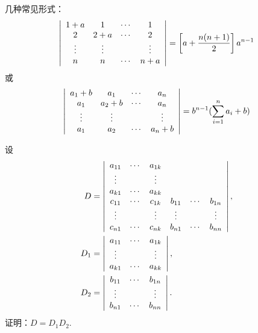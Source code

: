\begin{frame} 
\begin{zhu}
  几种常见形式：
  $$
  \left|
    \begin{array}{cccc}
      1+a &  1  & \cdots & 1   \\
      2   & 2+a & \cdots & 2  \\
      \vdots & \vdots &     & \vdots \\
      n   &  n  & \cdots & n+a
    \end{array}
  \right|  = \left[a+ \frac{n(n+1)}2\right]a^{n-1}
  $$
  或
  $$
  \left|
    \begin{array}{cccc}
      a_1+b & a_1   & \cdots & a_n   \\
      a_1   & a_2+b & \cdots  & a_n   \\
      \vdots   & \vdots  &     & \vdots \\
      a_1   & a_2   & \cdots & a_n+b
    \end{array}
  \right|  = b^{n-1}(\sum_{i=1}^na_i+b)
  $$      

\end{zhu}
%
\end{frame}

\begin{frame} 
\begin{testexample}
  设
  $$
  \begin{aligned}
    D &= \left|
      \begin{array}{cccccc}
        a_{11} & \cd & a_{1k} &    &    &   \\
        \vd    &     &  \vd  &    &    &   \\
        a_{k1} & \cd & a_{kk} &    &    &   \\
        c_{11} & \cd & c_{1k} & b_{11}&  \cd & b_{1n}   \\
        \vd    &     & \vd   & \vd  &    & \vd \\
        c_{n1} & \cd & c_{nk} & b_{n1}&  \cd & b_{nn}
      \end{array}
    \right|, \\
    D_1 &%
    = \left|
      \begin{array}{ccc}
        a_{11} & \cd & a_{1k} \\
        \vd    &     &  \vd  \\
        a_{k1} & \cd & a_{kk} \\
      \end{array}
    \right|, \\
    D_2 & %
    = \left|
      \begin{array}{ccc}
        b_{11} & \cd & b_{1n} \\
        \vd    &     &  \vd  \\
        b_{n1} & \cd & b_{nn} \\
      \end{array}
    \right|.
  \end{aligned}
  $$
  证明：$D=D_1D_2$.
\end{testexample}
\end{frame}

